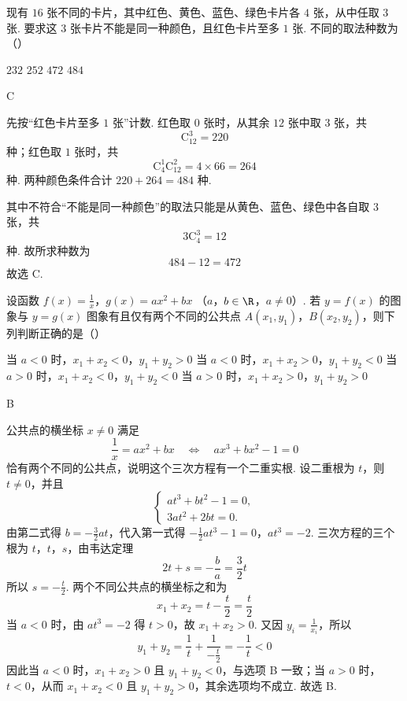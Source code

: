 \begin{problem}
现有 \(16\) 张不同的卡片，其中红色、黄色、蓝色、绿色卡片各 \(4\) 张，从中任取 \(3\) 张. 要求这 \(3\) 张卡片不能是同一种颜色，且红色卡片至多 \(1\) 张. 不同的取法种数为（\quad）

\choices
    {\(232\)}
    {\(252\)}
    {\(472\)}
    {\(484\)}
\end{problem}

\begin{answer}
C
\end{answer}

\begin{solution}
先按“红色卡片至多 \(1\) 张”计数. 红色取 \(0\) 张时，从其余 \(12\) 张中取 \(3\) 张，共
\[
\mathrm C_{12}^{3}=220
\]
种；红色取 \(1\) 张时，共
\[
\mathrm C_{4}^{1}\mathrm C_{12}^{2}=4\times66=264
\]
种. 两种颜色条件合计 \(220+264=484\) 种.

其中不符合“不能是同一种颜色”的取法只能是从黄色、蓝色、绿色中各自取 \(3\) 张，共
\[
3\mathrm C_{4}^{3}=12
\]
种. 故所求种数为
\[
484-12=472
\]
故选 C.
\end{solution}

\begin{problem}
设函数 \( f(x) = \frac{1}{x} \)，\( g(x) = ax^2 + bx\) （\(a\)，\(b \in \R\)，\(a \neq 0\)）. 若 \( y = f(x) \) 的图象与 \( y = g(x) \) 图象有且仅有两个不同的公共点 \(A(x_1, y_1)\)，\(B(x_2, y_2)\)，则下列判断正确的是（\quad）

\choices
    {当 \(a < 0\) 时，\(x_{1} + x_{2} < 0\)，\(y_{1} + y_{2} > 0\)}
    {当 \(a < 0\) 时，\(x_{1} + x_{2} > 0\)，\(y_{1} + y_{2} < 0\)}
    {当 \(a > 0\) 时，\(x_{1} + x_{2} < 0\)，\(y_{1} + y_{2} < 0\)}
    {当 \(a > 0\) 时，\(x_{1} + x_{2} > 0\)，\(y_{1} + y_{2} > 0\)}
\end{problem}

\begin{answer}
B
\end{answer}

\begin{solution}
公共点的横坐标 \(x\ne0\) 满足
\[
\frac1x=ax^2+bx
\quad\Longleftrightarrow\quad
ax^3+bx^2-1=0
\]
恰有两个不同的公共点，说明这个三次方程有一个二重实根. 设二重根为 \(t\)，则 \(t\ne0\)，并且
\[
\begin{cases}
at^3+bt^2-1=0,\\
3at^2+2bt=0.
\end{cases}
\]
由第二式得 \(b=-\frac32at\)，代入第一式得
\(-\frac12at^3-1=0\)，\(at^3=-2\).
三次方程的三个根为 \(t\)，\(t\)，\(s\)，由韦达定理
\[
2t+s=-\frac ba=\frac32t
\]
所以 \(s=-\frac t2\). 两个不同公共点的横坐标之和为
\[
x_1+x_2=t-\frac t2=\frac t2
\]
当 \(a<0\) 时，由 \(at^3=-2\) 得 \(t>0\)，故 \(x_1+x_2>0\). 又因 \(y_i=\frac{1}{x_i}\)，所以
\[
y_1+y_2=\frac1t+\frac1{-\frac{t}{2}}=-\frac1t<0
\]
因此当 \(a<0\) 时，\(x_1+x_2>0\) 且 \(y_1+y_2<0\)，与选项 B 一致；当 \(a>0\) 时，\(t<0\)，从而 \(x_1+x_2<0\) 且 \(y_1+y_2>0\)，其余选项均不成立. 故选 B.
\end{solution}

